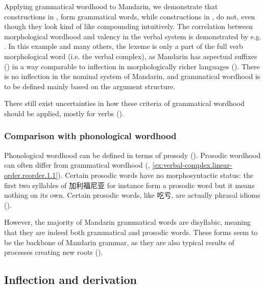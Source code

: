 \documentclass[UTF8, a4paper, oneside, scheme=plain, 12pt]{ctexrep}
\begin{document}
Applying grammatical wordhood to Mandarin,
we demonstrate that constructions in ,
 form grammatical words,
while constructions in , 
do not, even though they look kind of like compounding intuitively.
The correlation between morphological wordhood and valency in the verbal system 
is demonstrated by e.g. .
In this example and many others, the lexeme is only a part of the full verb morphological word (i.e. the verbal complex),
as Mandarin has aspectual suffixes ()
in a way comparable to inflection in morphologically richer languages ().
There is no inflection in the nominal system of Mandarin,
and grammatical wordhood is to be defined mainly based on the argument structure.

There still exist uncertainties in how these criteria of grammatical wordhood should be applied,
mostly for verbs
().

\subsubsection{Comparison with phonological wordhood}

Phonological wordhood can be defined in terms of prosody ().
Prosodic wordhood can often differ from grammatical wordhood 
(, \ref{ex:verbal-complex.linear-order.reorder.1.1}).
Certain prosodic words have no morphosyntactic status:
the first two syllables of 加利福尼亚 for instance form a prosodic word
but it means nothing on its own.
Certain prosodic words, like 吃亏, are actually phrasal idioms
().

However, the majority of Mandarin grammatical words are disyllabic, meaning that they are indeed both grammatical and prosodic words.
These forms seem to be the backbone of Mandarin grammar,
as they are also typical results of processes creating new roots
().

\subsection{Inflection and derivation}\label{sec:grammatical.wordhood.inflection}
\end{document}
